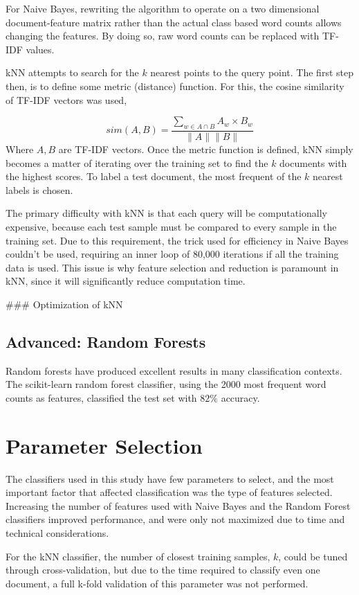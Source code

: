\documentclass[10pt,twocolumn]{article}
\begin{document}
For Naive Bayes, rewriting the algorithm to operate on a two dimensional document-feature matrix rather than the actual class based word counts allows changing the features. By doing so, raw word counts can be replaced with TF-IDF values. 

kNN attempts to search for the $k$ nearest points to the query point. The first step then, is to define some metric (distance) function. For this, the cosine similarity of TF-IDF vectors was used,

\[
sim(A,B) = \frac {\sum_{w \in A \cap B} A_w \times B_w} {\| A \| \| B \|}
\]
Where $A,B$ are TF-IDF vectors. Once the metric function is defined, kNN simply becomes a matter of iterating over the training set to find the $k$ documents with the highest scores. To label a test document, the most frequent of the $k$ nearest labels is chosen.

The primary difficulty with kNN is that each query will be computationally expensive, because each test sample must be compared to every sample in the training set. Due to this requirement, the trick used for efficiency in Naive Bayes couldn't be used, requiring an inner loop of 80,000 iterations if all the training data is used. This issue is why feature selection and reduction is paramount in kNN, since it will significantly reduce computation time.

\#\#\# Optimization of kNN

\subsection*{Advanced: Random Forests}

Random forests have produced excellent results in many classification contexts. The scikit-learn random forest classifier, using the 2000 most frequent word counts as features, classified the test set with $82\%$ accuracy.

\section*{Parameter Selection}

The classifiers used in this study have few parameters to select, and the most important factor that affected classification was the type of features selected.  Increasing the number of features used with Naive Bayes and the Random Forest classifiers improved performance, and were only not maximized due to time and technical considerations.

For the kNN classifier, the number of closest training samples, $k$, could be tuned through cross-validation, but due to the time required to classify even one document, a full k-fold validation of this parameter was not performed.
\end{document}
